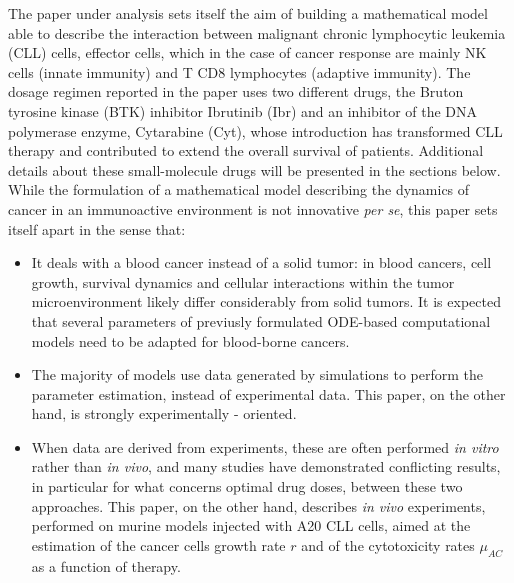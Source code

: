 The paper under analysis sets itself the aim of building a mathematical model able to describe the interaction between malignant chronic lymphocytic leukemia (CLL) cells, effector cells, which in the case of cancer response are mainly NK cells (innate immunity) and T CD8 lymphocytes (adaptive immunity).  
The dosage regimen reported in the paper uses two different drugs, the Bruton tyrosine kinase (BTK) inhibitor Ibrutinib (Ibr) and an inhibitor of the DNA polymerase enzyme, Cytarabine (Cyt), whose introduction has transformed CLL therapy and contributed to extend the overall survival of patients. 
Additional details about these small-molecule drugs will be presented in the sections below. While the formulation of a mathematical model describing the dynamics of cancer in an immunoactive environment is not innovative \textit{per se}, this paper sets itself apart in the sense that:
\begin{itemize}
\item It deals with a blood cancer instead of a solid tumor: in blood cancers, cell growth, survival dynamics and cellular interactions within the
tumor microenvironment likely differ considerably from solid tumors. It is expected that several parameters of previusly formulated ODE-based computational models need to be adapted for blood-borne cancers.
\item The majority of models use data generated by simulations to perform the parameter estimation, instead of experimental data. This paper, on the other hand, is strongly experimentally - oriented.
\item When data are derived from experiments, these are often performed \textit{in vitro} rather than \textit{in vivo}, and many studies have demonstrated conflicting results, in particular for what concerns optimal drug doses, between these two approaches. This paper, on the other hand, describes \textit{in vivo} experiments, performed on murine models injected with A20 CLL cells, aimed at the estimation of the cancer cells growth rate $r$ and of the cytotoxicity rates $\mu_{AC}$ as a function of therapy. \par
\end{itemize}
